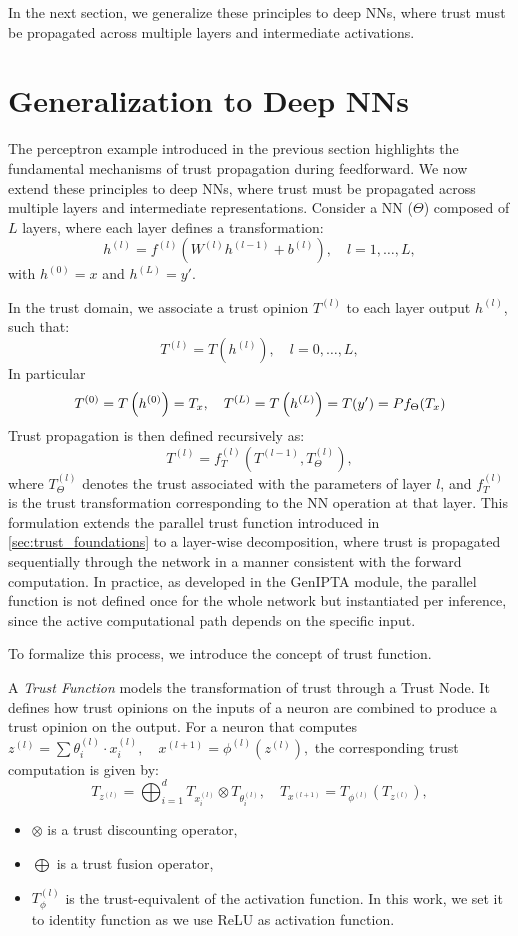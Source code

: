 In the next section, we generalize these principles to deep \acp{NN}, where trust must be propagated across multiple layers and intermediate activations.


\section{Generalization to Deep \acp{NN}}
\label{sec:dnn_trust}

The perceptron example introduced in the previous section highlights the fundamental mechanisms of trust propagation during feedforward. We now extend these principles to deep \acp{NN}, where trust must be propagated across multiple layers and intermediate representations. Consider a \ac{NN} ($\Theta$) composed of $L$ layers, where each layer defines a transformation:
\[
h^{(l)} = f^{(l)}\left(W^{(l)} h^{(l-1)} + b^{(l)}\right), \quad l = 1, \dots, L,
\]
with $h^{(0)} = x$ and $h^{(L)} = y'$.

In the trust domain, we associate a trust opinion $T^{(l)}$ to each layer output $h^{(l)}$, such that:
\[
T^{(l)} = T\left(h^{(l)}\right), \quad l = 0, \dots, L,
\]
In particular
\[
T^{(0)} = T\left(h^{(0)}\right) = T_x, \quad T^{(L)} = T\left(h^{(L)}\right) = T(y') = Pf_\Theta(T_x)\protect
\]
Trust propagation is then defined recursively as:
\[
T^{(l)} = f_T^{(l)}\left(T^{(l-1)}, T^{(l)}_{\Theta}\right),
\]
where $T^{(l)}_{\Theta}$ denotes the trust associated with the parameters of layer $l$, and $f_T^{(l)}$ is the trust transformation corresponding to the \ac{NN} operation at that layer. This formulation extends the parallel trust function introduced in \cref{sec:trust_foundations} to a layer-wise decomposition, where trust is propagated sequentially through the network in a manner consistent with the forward computation. In practice, as developed in the \ac{GenIPTA} module, the parallel function is not defined once for the whole network but instantiated per inference, since the active computational path depends on the specific input. 

To formalize this process, we introduce the concept of trust function.
\begin{definition}\label{def:trustfunc}
A \emph{Trust Function} models the transformation of trust through a Trust Node. It defines how trust opinions on the inputs of a neuron are combined to produce a trust opinion on the output. 
For a neuron that computes
\(
z^{(l)} = \sum \theta^{(l)}_i \cdot x^{(l)}_i, \quad x^{(l+1)} = \phi^{(l)}(z^{(l)}),
\)
the corresponding trust computation is given by:
\[
T_{z^{(l)}} = \bigoplus_{i=1}^{d} T_{x_{i}^{(l)}} \otimes T_{\theta_{i}^{(l)}}, \quad
T_{x^{(l+1)}} = T_{\phi^{(l)}}(T_{z^{(l)}}),
\]
\begin{itemize}
    \item \( \otimes \) is a trust discounting operator,
    \item \(\bigoplus\) is a trust fusion operator,
    \item \( T_{\phi}^{(l)} \) is the trust-equivalent of the activation function. In this work, we set it to identity function as we use ReLU as activation function.
\end{itemize}
\end{definition}

